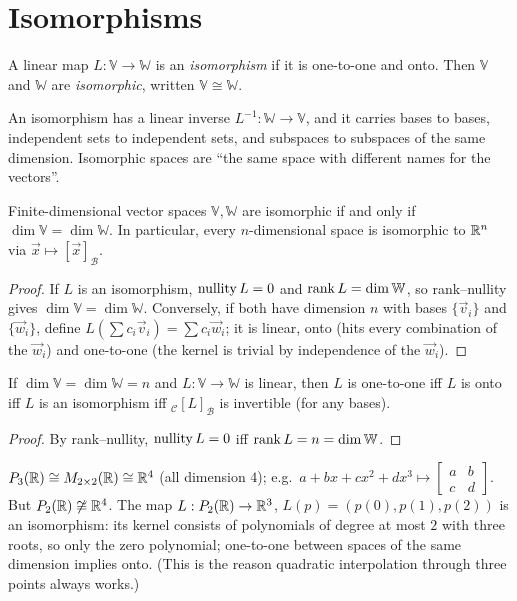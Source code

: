 \section{Isomorphisms}

\begin{definition}
A linear map $L:\mathbb V\to\mathbb W$ is an \emph{isomorphism} if it is one-to-one and onto. Then $\mathbb V$ and $\mathbb W$ are
\emph{isomorphic}, written $\mathbb V\cong\mathbb W$.
\end{definition}

An isomorphism has a linear inverse $L^{-1}:\mathbb W\to\mathbb V$, and it carries bases to bases, independent sets to
independent sets, and subspaces to subspaces of the same dimension. Isomorphic spaces are ``the same space with
different names for the vectors''.

\begin{theorem}
Finite-dimensional vector spaces $\mathbb V,\mathbb W$ are isomorphic if and only if $\dim\mathbb V=\dim\mathbb W$. In
particular, every $n$-dimensional space is isomorphic to $\mathbb{R}^n$ via $\vec x\mapsto[\vec x]_{\mathcal B}$.
\end{theorem}
\begin{proof}
If $L$ is an isomorphism, $\operatorname{nullity} L=0$ and $\operatorname{rank} L=\dim\mathbb W$, so rank--nullity gives $\dim\mathbb V=\dim\mathbb W$.
Conversely, if both have dimension $n$ with bases $\{\vec v_i\}$ and $\{\vec w_i\}$, define
$L(\sum c_i\vec v_i)=\sum c_i\vec w_i$; it is linear, onto (hits every combination of the $\vec w_i$) and one-to-one
(the kernel is trivial by independence of the $\vec w_i$).
\end{proof}

\begin{theorem}
If $\dim\mathbb V=\dim\mathbb W=n$ and $L:\mathbb V\to\mathbb W$ is linear, then $L$ is one-to-one iff $L$ is onto iff
$L$ is an isomorphism iff ${}_{\mathcal C}[L]_{\mathcal B}$ is invertible (for any bases).
\end{theorem}
\begin{proof}
By rank--nullity, $\operatorname{nullity} L=0$ iff $\operatorname{rank} L=n=\dim\mathbb W$.
\end{proof}

\begin{example}
$P_{3}(\mathbb{R})\cong M_{2\times 2}(\mathbb{R})\cong\mathbb{R}^4$ (all dimension $4$); e.g.\ $a+bx+cx^2+dx^3\mapsto\begin{bmatrix}a&b\\c&d\end{bmatrix}$. But
$P_{2}(\mathbb{R})\not\cong\mathbb{R}^4$. The map $L:P_{2}(\mathbb{R})\to\mathbb{R}^3$, $L(p)=(p(0),p(1),p(2))$ is an isomorphism: its kernel consists of
polynomials of degree at most $2$ with three roots, so only the zero polynomial; one-to-one between spaces of the
same dimension implies onto. (This is the reason quadratic interpolation through three points always works.)
\end{example}

